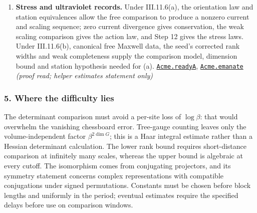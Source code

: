 \documentclass[
  letterpaper,
  11pt]{article}
\begin{document}
\begin{enumerate}
  single field for all testers, and translation covariance, continuity
  and grid density extend the identity to all distinct configurations.
  Constant and rotational Killing fields give the translation and
  rotation maps.
  \href{https://github.com/yang-mills-group/OpenAI-YM-20261028/blob/3456e5e75cf8d4cd558955a5c7638fba2d68f464/YM/MergeProof/West/Blanca.lean\#L49-L120}{\texttt{tenet}},
  \href{https://github.com/yang-mills-group/OpenAI-YM-20261028/blob/3456e5e75cf8d4cd558955a5c7638fba2d68f464/YM/MergeProof/West/Bravo.lean\#L55-L89}{\texttt{annular\_fieldA}},
  \href{https://github.com/yang-mills-group/OpenAI-YM-20261028/blob/3456e5e75cf8d4cd558955a5c7638fba2d68f464/YM/MergeProof/West/Orange.lean\#L33-L63}{\texttt{shells\_law}}
  \emph{(proof read; annulus comparison inputs statement only)}
\item
  \textbf{Stress and ultraviolet records.} Under III.11.6(a), the
  orientation law and station equivalences allow the free comparison to
  produce a nonzero current and scaling sequence; zero current
  divergence gives conservation, the weak scaling comparison gives the
  action law, and Step 12 gives the stress laws. Under III.11.6(b),
  canonical free Maxwell data, the seed's corrected rank widths and weak
  completeness supply the comparison model, dimension bound and station
  hypothesis needed for (a).
  \href{https://github.com/yang-mills-group/OpenAI-YM-20261028/blob/3456e5e75cf8d4cd558955a5c7638fba2d68f464/YM/MergeProof/Emanate.lean\#L15-L30}{\texttt{Acme.readyA}},
  \href{https://github.com/yang-mills-group/OpenAI-YM-20261028/blob/3456e5e75cf8d4cd558955a5c7638fba2d68f464/YM/MergeProof/Emanate.lean\#L31-L37}{\texttt{Acme.emanate}}
  \emph{(proof read; helper estimates statement only)}
\end{enumerate}

\subsubsection{5. Where the difficulty
lies}\label{where-the-difficulty-lies-13}

The determinant comparison must avoid a per-site loss of \(\log\beta\):
that would overwhelm the vanishing chessboard error. Tree-gauge counting
leaves only the volume-independent factor \(\beta^{2\dim G}\); this is a
Haar integral estimate rather than a Hessian determinant calculation.
The lower rank bound requires short-distance comparison at infinitely
many scales, whereas the upper bound is algebraic at every cutoff. The
isomorphism comes from conjugating projectors, and its symmetry
statement concerns complex representations with compatible conjugations
under signed permutations. Constants must be chosen before block lengths
and uniformly in the period; eventual estimates require the specified
delays before use on comparison windows.
\end{document}

